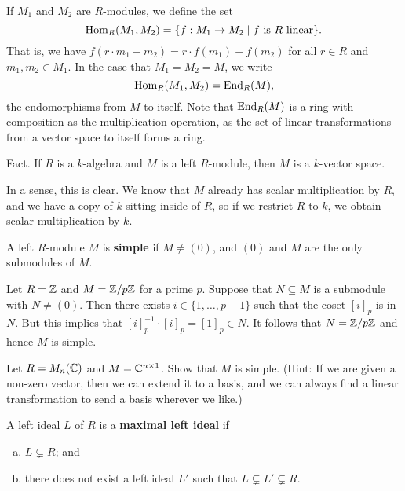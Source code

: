 \begin{remark}{}
If $M_1$ and $M_2$ are $R$-modules, we define the set 
\[ \operatorname{Hom}_R(M_1, M_2) = \{f : M_1 \to M_2 \mid f \text{ is $R$-linear}\}. \]
That is, we have $f(r \cdot m_1 + m_2) = r \cdot f(m_1) + f(m_2)$ for all $r \in R$ and $m_1, m_2 \in M_1$. 
In the case that $M_1 = M_2 = M$, we write 
\[ \operatorname{Hom}_R(M_1, M_2) = \operatorname{End}_R(M), \]
the endomorphisms from $M$ to itself. Note that $\operatorname{End}_R(M)$ is a ring with composition as 
the multiplication operation, as the set of linear transformations from a vector space to itself 
forms a ring. 
\end{remark}

{\sc Fact.} If $R$ is a $k$-algebra and $M$ is a left $R$-module, then $M$ is a $k$-vector space. 

In a sense, this is clear. We know that $M$ already has scalar multiplication by $R$, and we have a 
copy of $k$ sitting inside of $R$, so if we restrict $R$ to $k$, we obtain scalar multiplication by $k$.

\begin{defn}{}
A left $R$-module $M$ is {\bf simple} if $M \neq (0)$, and $(0)$ and $M$ are the only submodules of $M$.
\end{defn}

\begin{exmp}{}
Let $R = \mathbb{Z}$ and $M = \mathbb{Z}/p\mathbb{Z}$ for a prime $p$. Suppose that $N \subseteq M$ is a submodule with 
$N \neq (0)$. Then there exists $i \in \{1, \dots, p-1\}$ such that the coset $[i]_p$ is in $N$. 
But this implies that $[i]_p^{-1} \cdot [i]_p = [1]_p \in N$. It follows that $N = \mathbb{Z}/p\mathbb{Z}$ and hence 
$M$ is simple. 
\end{exmp}

\begin{exercise}{}
Let $R = M_n(\mathbb{C})$ and $M = \mathbb{C}^{n\times 1}$. Show that $M$ is simple. (Hint: If we are given a 
non-zero vector, then we can extend it to a basis, and we can always find a linear transformation to 
send a basis wherever we like.)
\end{exercise}

\begin{defn}{}
A left ideal $L$ of $R$ is a {\bf maximal left ideal} if 
\begin{enumerate}[(a)]
    \item $L \subsetneq R$; and
    \item there does not exist a left ideal $L'$ such that $L \subsetneq L' \subsetneq R$. 
\end{enumerate} 
\end{defn}

